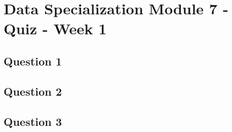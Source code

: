 \documentclass[french]{article}
\begin{document}
\section*{Data Specialization Module 7 - Quiz - Week 1}
\subsection*{Question 1}

\newpage
\subsection*{Question 2}


\newpage
\subsection*{Question 3}
\end{document}
